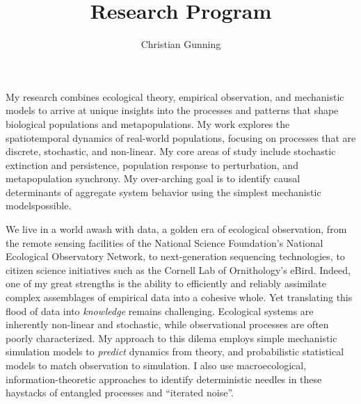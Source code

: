 \documentclass[12pt]{article}
\author{Christian Gunning}
\title{Research Program}
\begin{document}
\maketitle
\thispagestyle{empty}
\linespread{1.25}\selectfont

My research combines ecological theory, empirical observation, and 
mechanistic models to arrive at unique insights into the processes 
and patterns that shape biological populations and metapopulations. 
My work explores the spatiotemporal dynamics of real-world populations,
focusing on processes that are discrete, stochastic, and non-linear. 
My core areas of study include stochastic extinction and persistence, 
population response to perturbation, and metapopulation synchrony.
My over-arching goal is to identify causal determinants of aggregate 
system behavior using the simplest mechanistic modelspossible.

We live in a world awash with data, a golden era
of ecological observation, from the remote sensing 
facilities of the National Science Foundation's National 
Ecological Observatory Network, to next-generation sequencing technologies, 
to citizen science initiatives such as the Cornell Lab of 
Ornithology's eBird. 
Indeed, one of my great strengths is the ability to 
efficiently and reliably assimilate complex
assemblages of empirical data into a cohesive whole.
Yet translating this flood of data into {\em knowledge} remains challenging. Ecological
systems are inherently non-linear and stochastic, 
while observational processes are often poorly characterized. 
My approach to this dilema 
employs simple mechanistic simulation 
models to {\em predict} dynamics from theory, 
and probabilistic statistical models to match 
observation to simulation.
I also use macroecological, information-theoretic 
approaches to identify deterministic needles in 
these haystacks of entangled processes 
and ``iterated noise''. 
\end{document}
